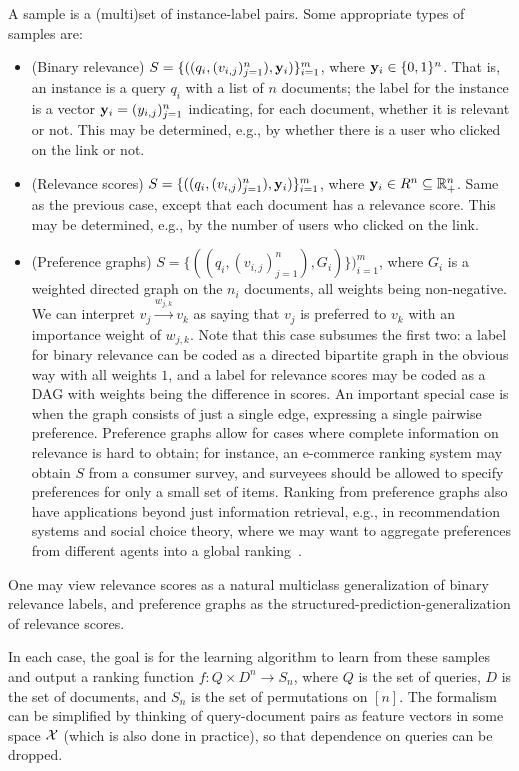 A sample is a (multi)set of instance-label pairs. Some appropriate types of samples are:
\begin{itemize}
\item (Binary relevance)
  $S = \{ ((q_i, (v_{i, j})_{j=1}^{n}), {\mathbf y}_i )\}_{i=1}^m$, where
  ${\mathbf y}_{i} \in \{0, 1\}^n$.
  That is, an instance is a query $q_i$ with a list of $n$ documents;
  the label for the instance is a vector ${\mathbf y}_i = (y_{i, j})_{j=1}^{n}$ indicating,
  for each document, whether it is relevant or not.
  This may be determined, e.g., by whether there is a
  user who clicked on the link or not.
\item (Relevance scores)
  $S = \{ ( (q_i, (v_{i, j})_{j=1}^{n}), {\mathbf y}_i )\}_{i=1}^m$,
  where ${\mathbf y}_i \in R^n \subseteq {\mathbb R}_+^n$.
  Same as the previous case, except that each document has a relevance
  score. 
  This may be determined, e.g., by the number of users who clicked on the link.
\item (Preference graphs) 
  $S = \{((q_i, (v_{i,j})_{j=1}^{n}), G_i)\})_{i=1}^m$, where $G_i$ is a weighted
  directed graph on the $n_i$ documents, all weights being non-negative.
  We can interpret $v_j \overset{w_{j,k}}{\to} v_k$ as saying that $v_j$ is
  preferred to $v_k$ with an importance weight of $w_{j,k}$.
  Note that this case subsumes the first two: a label for binary relevance
  can be coded as a directed bipartite graph in the obvious way
  with all weights $1$, and a label for relevance scores may be coded as a
  DAG with weights being the difference in scores.
  An important special case is when the graph consists
  of just a single edge, expressing a single pairwise preference.
  Preference graphs allow for cases where complete information on relevance is
  hard to obtain; for instance, an e-commerce ranking system may obtain $S$
  from a consumer survey, and surveyees should be allowed to specify
  preferences for only a small set of items. Ranking from preference graphs
  also have applications beyond just information retrieval, e.g., in
  recommendation systems and social choice theory, where we may want to
  aggregate preferences from different agents into a global ranking~\cite{}.
\end{itemize}
One may view relevance scores as a natural multiclass generalization of binary
relevance labels, and preference graphs as the
structured-prediction-generalization of relevance scores.

In each case, the goal is for the learning algorithm to learn from these samples
and output a ranking function
$f: Q \times D^n \to S_n$, where $Q$
is the set of queries, $D$ is the set of documents,
and $S_n$ is the set of permutations on $[n]$.
The formalism can be simplified by thinking of query-document pairs as feature
vectors in some space ${\mathcal X}$ (which is also done in practice), so
that dependence on queries can be dropped.

